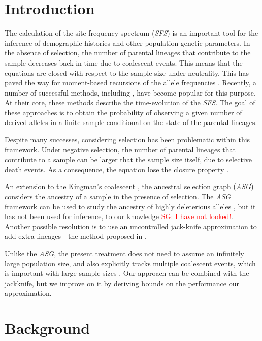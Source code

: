 \documentclass[review]{elsarticle}
\newcommand{\sgcomment}[1]{\textcolor{red}{SG: #1}}
\begin{document}
\section{Introduction}
\label{sec:introduciton}

The calculation of the site frequency spectrum (\textit{SFS}) is an important tool for the inference
of demographic histories and other population genetic parameters. In the absence of selection, the
number of parental lineages that contribute to the sample decreases back in time due to coalescent
events. This means that the equations are closed with respect to the sample size under neutrality.
This has paved the way for moment-based recursions of the allele frequencies
\cite{KimuraCrow1964,Ewens1972,DonnellyKurtz1999}. Recently, a number of successful methods,
including \cite{GutenkunstEtAl2009,JouganousEtAl2017,KammEtAl2017}, have become popular for this
purpose. At their core, these methods describe the time-evolution of the \textit{SFS}. The goal of
these approaches is to obtain the probability of observing a given number of derived alleles in a
finite sample conditional on the state of the parental lineages.

Despite many successes, considering selection has been problematic within this framework. Under
negative selection, the number of parental lineages that contribute to a sample can be larger that
the sample size itself, due to selective death events. As a consequence, the equation lose the
closure property \cite{JouganousEtAl2017}.

An extension to the Kingman's coalescent \cite{Kingman1982a}, the ancestral selection graph
(\textit{ASG}) \cite{KroneNeuhauser1997} considers the ancestry of a sample in the presence of
selection. The \textit{ASG} framework can be used to study the ancestry of highly deleterious
alleles \cite{Wakeley2009}, but it has not been used for inference, to our knowledge \sgcomment{I have not looked!}. Another
possible resolution is to use an uncontrolled jack-knife approximation to add extra lineages - the
method proposed in \cite{JouganousEtAl2017}.

Unlike the \textit{ASG}, the present treatment does not need to assume an infinitely large
population size, and also explicitly tracks multiple coalescent events, which is important with
large sample sizes \cite{BhaskarEtAl2014}. Our approach can be combined with the jackknife, but we
improve on it by deriving bounds on the performance our approximation.

\section{Background}
\label{sec:background}
\end{document}
